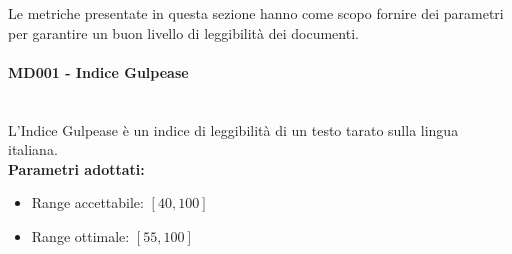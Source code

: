 Le metriche presentate in questa sezione hanno come scopo fornire dei parametri per garantire un buon livello di leggibilità dei documenti.

\paragraph{MD001 - Indice Gulpease}\mbox{}\\[0,3cm]
L'Indice Gulpease è un indice di leggibilità di un testo tarato sulla lingua italiana. \\[0,2cm]
\textbf{Parametri adottati:}
\begin{itemize}
	\item Range accettabile: $[40 , 100]$
	\item Range ottimale: $[55 , 100]$
\end{itemize}
